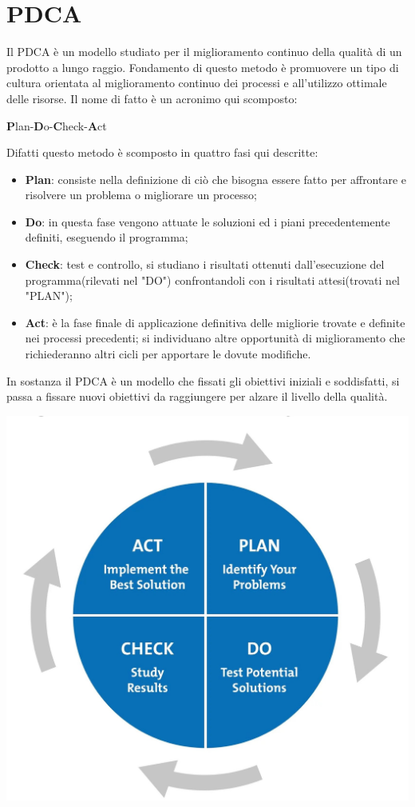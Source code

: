 \section{PDCA}
Il PDCA è un modello studiato per il miglioramento continuo della qualità di un prodotto a lungo raggio. Fondamento di questo metodo è promuovere un tipo di cultura orientata al miglioramento continuo dei processi e all'utilizzo ottimale delle risorse. Il nome di fatto è un acronimo qui scomposto:
\begin{center}
	\item \textbf{P}lan-\textbf{D}o-\textbf{C}heck-\textbf{A}ct
\end{center}
Difatti questo metodo è scomposto in quattro fasi qui descritte:
\begin{itemize}
	\item \textbf{Plan}: consiste nella definizione di ciò che bisogna essere fatto per affrontare e risolvere un problema o migliorare un processo;
	\item \textbf{Do}: in questa fase vengono attuate le soluzioni ed i piani precedentemente definiti, eseguendo il programma;
	\item \textbf{Check}: test e controllo, si studiano i risultati ottenuti dall'esecuzione del programma(rilevati nel "DO") confrontandoli con i risultati attesi(trovati nel "PLAN"); 
	\item \textbf{Act}: è la fase finale di applicazione definitiva delle migliorie trovate e definite nei processi precedenti; si individuano altre opportunità di miglioramento che richiederanno altri cicli per apportare le dovute modifiche.
\end{itemize}
In sostanza il PDCA è un modello che fissati gli obiettivi iniziali e soddisfatti, si passa a fissare nuovi obiettivi da raggiungere per alzare il livello della qualità.
\begin{center}
\item \includegraphics[scale=0.3]{./images/pdca.jpg} 
\end{center}
 